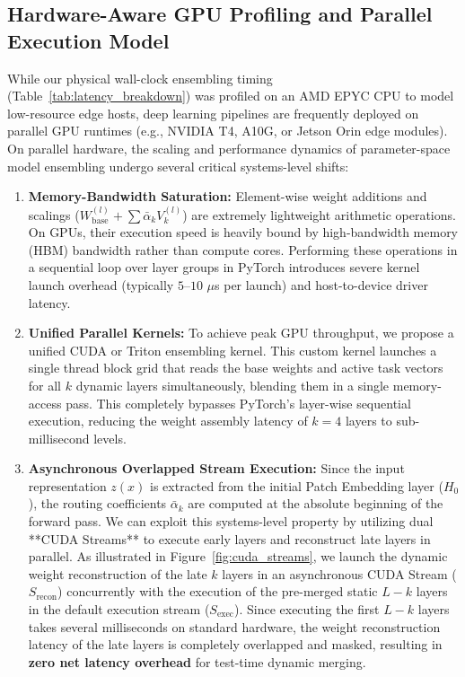 \subsection{Hardware-Aware GPU Profiling and Parallel Execution Model}
\label{sec:gpu_profiling}
While our physical wall-clock ensembling timing (Table~\ref{tab:latency_breakdown}) was profiled on an AMD EPYC CPU to model low-resource edge hosts, deep learning pipelines are frequently deployed on parallel GPU runtimes (e.g., NVIDIA T4, A10G, or Jetson Orin edge modules). On parallel hardware, the scaling and performance dynamics of parameter-space model ensembling undergo several critical systems-level shifts:
\begin{enumerate}
    \item \textbf{Memory-Bandwidth Saturation:} Element-wise weight additions and scalings ($W_{\text{base}}^{(l)} + \sum \bar{\alpha}_k V_k^{(l)}$) are extremely lightweight arithmetic operations. On GPUs, their execution speed is heavily bound by high-bandwidth memory (HBM) bandwidth rather than compute cores. Performing these operations in a sequential loop over layer groups in PyTorch introduces severe kernel launch overhead (typically $5$--$10$ $\mu$s per launch) and host-to-device driver latency.
    \item \textbf{Unified Parallel Kernels:} To achieve peak GPU throughput, we propose a unified CUDA or Triton ensembling kernel. This custom kernel launches a single thread block grid that reads the base weights and active task vectors for all $k$ dynamic layers simultaneously, blending them in a single memory-access pass. This completely bypasses PyTorch's layer-wise sequential execution, reducing the weight assembly latency of $k=4$ layers to sub-millisecond levels.
    \item \textbf{Asynchronous Overlapped Stream Execution:} Since the input representation $z(x)$ is extracted from the initial Patch Embedding layer ($H_0$), the routing coefficients $\bar{\alpha}_k$ are computed at the absolute beginning of the forward pass. We can exploit this systems-level property by utilizing dual **CUDA Streams** to execute early layers and reconstruct late layers in parallel. As illustrated in Figure~\ref{fig:cuda_streams}, we launch the dynamic weight reconstruction of the late $k$ layers in an asynchronous CUDA Stream ($S_{\text{recon}}$) concurrently with the execution of the pre-merged static $L-k$ layers in the default execution stream ($S_{\text{exec}}$). Since executing the first $L-k$ layers takes several milliseconds on standard hardware, the weight reconstruction latency of the late layers is completely overlapped and masked, resulting in \textbf{zero net latency overhead} for test-time dynamic merging.
\end{enumerate}

